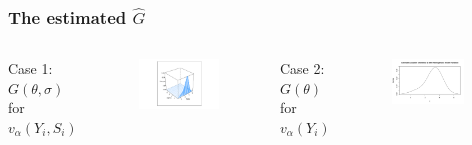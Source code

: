 \documentclass[10pt,mathserif,aspectratio=169]{beamer}
\begin{document}
\begin{frame}
  \frametitle{The estimated $\hat{G}$}
  \begin{columns}[T,onlytextwidth]
    Case 1: $G(\theta,\sigma)$ for $v_\alpha(Y_i,S_i)$
    \begin{figure}
      \centering
      \includegraphics[width=\textwidth]{../../Figures/2013-2022/GMM_fd/GLVmix_s.pdf}
    \end{figure}

    Case 2: $G(\theta)$ for $v_\alpha(Y_i)$
    \begin{figure}
      \centering
      \includegraphics[width=0.9\textwidth]{../../Figures/2013-2022/GMM_fd/GLmix_s.pdf}
    \end{figure}
  \end{columns}
\end{frame}
\end{document}

